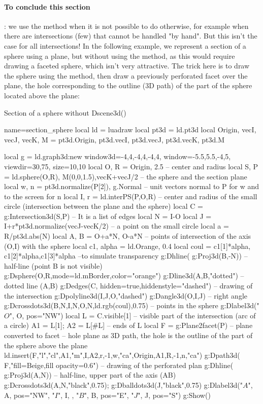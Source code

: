 \paragraph{To conclude this section}: we use the  method when it is not possible to do otherwise, for example when there are intersections (few) that cannot be handled "by hand". But this isn't the case for all intersections! In the following example, we represent a section of a sphere using a plane, but without using the  method, as this would require drawing a faceted sphere, which isn't very attractive. The trick here is to draw the sphere using the  method, then draw a previously perforated facet over the plane, the hole corresponding to the outline (3D path) of the part of the sphere located above the plane:

\begin{demo}{Section of a sphere without Dscene3d()}
\begin{luadraw}{name=section_sphere}
local ld = luadraw
local pt3d = ld.pt3d
local Origin, vecI, vecJ, vecK, M = pt3d.Origin, pt3d.vecI, pt3d.vecJ, pt3d.vecK, pt3d.M

local g = ld.graph3d:new{ window3d={-4,4,-4,4,-4,4}, window={-5.5,5.5,-4,5}, viewdir={30,75}, size={10,10}}
local O, R = Origin, 2.5 -- center and radius
local S, P = ld.sphere(O,R), {M(0,0,1.5),vecK+vecJ/2} -- the sphere and the section plane
local w, n = pt3d.normalize(P[2]), g.Normal -- unit vectors normal to P for w and to the screen for n
local I, r = ld.interPS(P,{O,R}) -- center and radius of the small circle (intersection between the plane and the sphere)
local C = g:Intersection3d(S,P) -- It is a list of edges
local N = I-O
local J = I+r*pt3d.normalize(vecJ-vecK/2) -- a point on the small circle
local a = R/pt3d.abs(N)
local A, B = O+a*N, O-a*N -- points of intersection of the axis (O,I) with the sphere
local c1, alpha = ld.Orange, 0.4
local coul = {c1[1]*alpha, c1[2]*alpha,c1[3]*alpha} --to simulate transparency
g:Dhline( g:Proj3d({B,-N})) -- half-line (point B is not visible)
g:Dsphere(O,R,{mode=ld.mBorder,color="orange"})
g:Dline3d(A,B,"dotted") -- dotted line (A,B)
g:Dedges(C, {hidden=true,hiddenstyle="dashed"}) -- drawing of the intersection
g:Dpolyline3d({I,J,O},"dashed")
g:Dangle3d(O,I,J) -- right angle
g:Dcrossdots3d({{B,N},{I,N},{O,N}},ld.rgb(coul),0.75) -- points in the sphere
g:Dlabel3d("$O$", O, {pos="NW"})
local L = C.visible[1] -- visible part of the intersection (arc of a circle)
A1 = L[1]; A2 = L[#L] -- ends of L
local F = g:Plane2facet(P) -- plane converted to facet
-- hole plane as 3D path, the hole is the outline of the part of the sphere above the plane
ld.insert(F,{"l","cl",A1,"m",I,A2,r,-1,w,"ca",Origin,A1,R,-1,n,"ca"})
g:Dpath3d( F,"fill=Beige,fill opacity=0.6") -- drawing of the perforated plan
g:Dhline( g:Proj3d({A,N})) -- half-line, upper part of the axis (AB)
g:Dcrossdots3d({A,N},"black",0.75); g:Dballdots3d(J,"black",0.75)
g:Dlabel3d("$A$", A, {pos="NW"}, "$I$", I, {}, "$B$", B, {pos="E"}, "$J$", J, {pos="S"})
g:Show()
\end{luadraw}
\end{demo}

